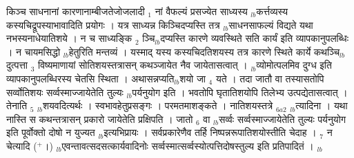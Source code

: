 \documentclass[article,12pt,a4paper]{memoir}%
\newcommand{\add}[1]{($^{+}$#1)}
\newcounter{parCount}
\begin{document}
	  
	  \pstart \leavevmode%
	किञ्च साधनानां कारणानाम्बीजतेजोजलादी {\tiny $_{1}$} नां वैफल्यं प्रसज्येत साध्यस्य {\tiny $_{lb}$}कर्त्तव्यस्य कस्यचिद्रूपस्याभावादिति प्रयोगः । यत्र साध्यन्न किञ्चिदप्यस्ति तत्र {\tiny $_{lb}$}साधनसाफल्यं विद्यते यथा नभस्यनाधेयातिशये । न च साध्यङ्कि {\tiny $_{2}$} ञ्चि{\tiny $_{lb}$}दप्यस्ति कारणे व्यवस्थिते सति कार्यं इति व्यापकानुपलब्धिः । न चायमसिद्धो {\tiny $_{lb}$}हेतुरिति मन्तव्यं । यस्माद् यस्य कस्यचिदतिशयस्य तत्र कारणे स्थिते कार्ये कथञ्चि{\tiny $_{lb}$}दुत्पत्ता {\tiny $_{3}$} विष्यमाणायां सोतिशयस्तत्रासन् कथञ्जायेत नैव जायेतासत्वात् । {\tiny $_{lb}$}व्योमोत्पलमिव दुग्ध इति व्यापकानुपलब्धिरस्य चेतसि स्थिता । अथासन्नप्यति{\tiny $_{lb}$}शयो जा {\tiny $_{4}$} यते । तदा जातौ वा तस्यासतोपि सर्व्वोतिशयः सर्व्वस्माज्जायेतेति तुल्यः {\tiny $_{lb}$}पर्यनुयोग इति । भवतोपि घृतातिशयोपि तिलेभ्य उत्पद्येतासत्वात् । तेनाति {\tiny $_{5}$} {\tiny $_{lb}$}शयवदित्यर्थः । स्वभावहेतुप्रसङ्गः । परमतमाशङ्कते । {\color{DodgerBlue3}नातिशयस्तत्रे} {\tiny $_{6a2}$} {\tiny $_{lb}$}त्यादिना । यथा नास्ति स कथन्तत्रासन् प्रकारो जायेतेति प्रक्षिपति । जातो {\tiny $_{6}$} वा {\tiny $_{lb}$}सर्व्वः सर्व्वस्माज्जायेतेति तुल्यः पर्यनुयोग इति पूर्वोक्तो दोषो न युज्यत {\tiny $_{lb}$}इत्यभिप्रायः । सर्वप्रकारेणैव तर्हि निष्पन्नरूपातिशयोस्तीति चेदाह । {\tiny $_{7}$} {\color{DodgerBlue3}न चेत्यादि} \add{।} {\tiny $_{lb}$}एवन्तावत्सदसत्कार्यवादिनोः सर्व्वस्मात्सर्व्वस्योत्पत्तिदोषस्तुल्य इति प्रतिपादितं ।
	{}
	\pend%
      {\tiny $_{lb}$}
\end{document}

